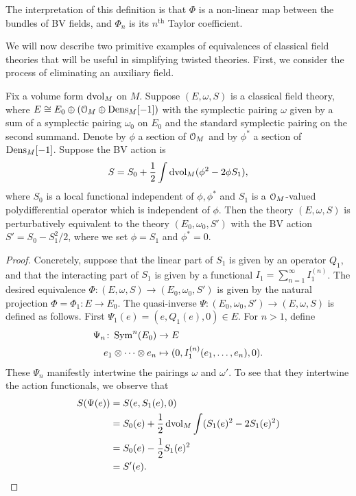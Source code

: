 \documentclass[10pt, oneside]{article}
\begin{document}
The interpretation of this definition is that $\Phi$ is a non-linear map between the bundles of BV fields, and $\Phi_n$ is its $n^{\text{th}}$ Taylor coefficient.

We will now describe two primitive examples of equivalences of classical field theories that will be useful in simplifying twisted theories. 
First, we consider the process of eliminating an auxiliary field.

\begin{prop}\label{prop:integrateoutfield}
Fix a volume form $\operatorname{dvol}_M$ on $M$. Suppose $(E, \omega, S)$ is a classical field theory, where $E\cong E_0\oplus (\mathcal O_M\oplus \mathrm{Dens}_M[-1])$ with the symplectic pairing $\omega$ given by a sum of a symplectic pairing $\omega_0$ on $E_0$ and the standard symplectic pairing on the second summand. Denote by $\phi$ a section of $\mathcal O_M$ and by $\phi^*$ a section of $\mathrm{Dens}_M[-1]$. Suppose the BV action is
\[S = S_0 + \frac{1}{2} \int \operatorname{dvol}_M (\phi^2 - 2\phi S_1),\]
where $S_0$ is a local functional independent of $\phi,\phi^*$ and $S_1$ is a $\mathcal O_M$-valued polydifferential operator which is independent of $\phi$. 
Then the theory $(E, \omega, S)$ is perturbatively equivalent to the theory $(E_0, \omega_0, S')$ with the BV action $S' = S_0 - S_1^2/2$, where we set $\phi = S_1$ and $\phi^* = 0$.
\end{prop}
\begin{proof}
Concretely, suppose that the linear part of $S_1$ is given by an operator $Q_1$, and that the interacting part of $S_1$ is given by a functional $I_1 = \sum_{n=1}^\infty I_1^{(n)}$.  
The desired equivalence $\Phi \colon (E, \omega, S) \to (E_0, \omega_0, S')$ is given by the natural projection $\Phi = \Phi_1 \colon E \to E_0$. 
The quasi-inverse $\Psi \colon (E_0, \omega_0, S') \to (E, \omega, S)$ is defined as follows.
First $\Psi_1(e) = (e, Q_1(e), 0) \in E$.
For $n > 1$, define
\begin{align*}
\Psi_n \colon \operatorname{Sym}^n(E_0) &\to E \\
e_1 \otimes \cdots \otimes e_n &\mapsto (0, I_1^{(n)}(e_1, \ldots, e_n), 0).
\end{align*}
These $\Psi_n$ manifestly intertwine the pairings $\omega$ and $\omega'$. To see that they intertwine the action functionals, we observe that 
\begin{align*}
S(\Psi(e)) &= S(e, S_1(e), 0) \\
&= S_0(e) + \frac 12 \operatorname{dvol}_M \int (S_1(e)^2 - 2 S_1(e)^2) \\
&= S_0(e) - \frac 12 S_1(e)^2 \\
&= S'(e).
\end{align*}
\end{proof}
\end{document}
